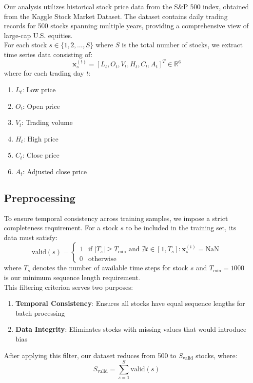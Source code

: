\documentclass[sigconf]{acmart}
\begin{document}
Our analysis utilizes historical stock price data from the S\&P 500 index, obtained from the Kaggle Stock Market Dataset. The dataset contains daily trading records for 500 stocks spanning multiple years, providing a comprehensive view of large-cap U.S. equities.\\

For each stock $s \in \{1, 2, \ldots, S\}$ where $S$ is the total number of stocks, we extract time series data consisting of:
$$\mathbf{x}_s^{(t)} = [L_t, O_t, V_t, H_t, C_t, A_t]^T \in \mathbb{R}^6$$
where for each trading day $t$:

\begin{enumerate}
  \item $L_t$: Low price
  \item $O_t$: Open price  
  \item $V_t$: Trading volume
  \item $H_t$: High price
  \item $C_t$: Close price
  \item $A_t$: Adjusted close price
\end{enumerate}

\subsection{Preprocessing}

To ensure temporal consistency across training samples, we impose a strict completeness requirement. For a stock $s$ to be included in the training set, its data must satisfy:
$$\text{valid}(s) = \begin{cases} 
1 & \text{if } |T_s| \geq T_{\min} \text{ and } \nexists t \in [1, T_s] : \mathbf{x}_s^{(t)} = \text{NaN} \\
0 & \text{otherwise}
\end{cases}$$
where $T_s$ denotes the number of available time steps for stock $s$ and $T_{\min} = 1000$ is our minimum sequence length requirement.\\

This filtering criterion serves two purposes:
\begin{enumerate}
  \item \textbf{Temporal Consistency}: Ensures all stocks have equal sequence lengths for batch processing
  \item \textbf{Data Integrity}: Eliminates stocks with missing values that would introduce bias
\end{enumerate}

After applying this filter, our dataset reduces from 500 to $S_{\text{valid}}$ stocks, where:
$$S_{\text{valid}} = \sum_{s=1}^{S} \text{valid}(s)$$
\end{document}
